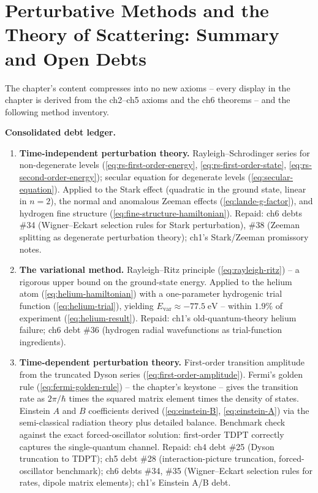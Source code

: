 \section{Perturbative Methods and the Theory of Scattering: Summary and Open Debts}
\label{sec:ch8summary}

The chapter's content compresses into no new axioms -- every display in the chapter is derived from the ch2--ch5 axioms and the ch6 theorems -- and the following method inventory.

\medskip\noindent\textbf{Consolidated debt ledger.}
\begin{enumerate}
\item[\S 8.1--8.2] \textbf{Time-independent perturbation theory.} Rayleigh--Schrodinger series for non-degenerate levels (\eqref{eq:rs-first-order-energy}, \eqref{eq:rs-first-order-state}, \eqref{eq:rs-second-order-energy}); secular equation for degenerate levels (\eqref{eq:secular-equation}). Applied to the Stark effect (quadratic in the ground state, linear in $n=2$), the normal and anomalous Zeeman effects (\eqref{eq:lande-g-factor}), and hydrogen fine structure (\eqref{eq:fine-structure-hamiltonian}). Repaid: ch6 debts \#34 (Wigner--Eckart selection rules for Stark perturbation), \#38 (Zeeman splitting as degenerate perturbation theory); ch1's Stark/Zeeman promissory notes.

\item[\S 8.3] \textbf{The variational method.} Rayleigh--Ritz principle (\eqref{eq:rayleigh-ritz}) -- a rigorous upper bound on the ground-state energy. Applied to the helium atom (\eqref{eq:helium-hamiltonian}) with a one-parameter hydrogenic trial function (\eqref{eq:helium-trial}), yielding $E_{\text{var}} \approx -77.5\;\text{eV}$ -- within $1.9\%$ of experiment (\eqref{eq:helium-result}). Repaid: ch1's old-quantum-theory helium failure; ch6 debt \#36 (hydrogen radial wavefunctions as trial-function ingredients).

\item[\S 8.4] \textbf{Time-dependent perturbation theory.} First-order transition amplitude from the truncated Dyson series (\eqref{eq:first-order-amplitude}). Fermi's golden rule (\eqref{eq:fermi-golden-rule}) -- the chapter's keystone -- gives the transition rate as $2\pi/\hbar$ times the squared matrix element times the density of states. Einstein $A$ and $B$ coefficients derived (\eqref{eq:einstein-B}, \eqref{eq:einstein-A}) via the semi-classical radiation theory plus detailed balance. Benchmark check against the exact forced-oscillator solution: first-order TDPT correctly captures the single-quantum channel. Repaid: ch4 debt \#25 (Dyson truncation to TDPT); ch5 debt \#28 (interaction-picture truncation, forced-oscillator benchmark); ch6 debts \#34, \#35 (Wigner--Eckart selection rules for rates, dipole matrix elements); ch1's Einstein A/B debt.


\end{enumerate}

